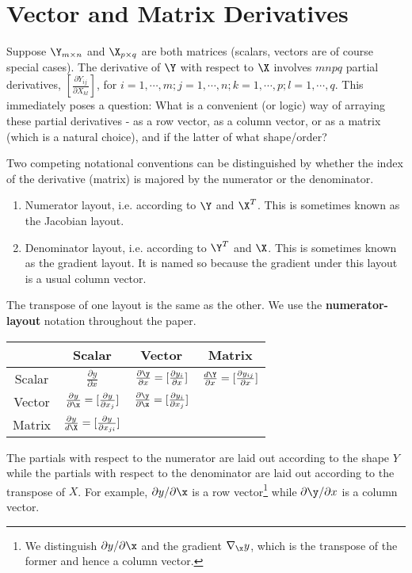 \section{Vector and Matrix Derivatives}
Suppose $\Y_{m \times n}$ and $\X_{p \times q}$ are both matrices (scalars, vectors are of course special cases). The derivative of $\Y$ with respect to $\X$ involves $mnpq$ partial derivatives, $\left[\frac{\partial Y_{ij}}{\partial X_{kl}}\right]$, for $i = 1, \cdots, m; j = 1, \cdots, n; k = 1, \cdots, p; l = 1, \cdots, q$. This immediately poses a question: What is a convenient (or logic) way of arraying these partial derivatives - as a row vector, as a column vector, or as a matrix (which is a natural choice), and if the latter of what shape/order?

Two competing notational conventions can be distinguished by whether the index of the derivative (matrix) is majored by the numerator or the denominator.
\begin{enumerate}
	\item Numerator layout, i.e. according to $\Y$ and $\X^T$. This is sometimes known as the Jacobian layout.
	\item Denominator layout, i.e. according to $\Y^T$ and $\X$. This is sometimes known as the gradient layout. It is named so because the gradient under this layout is a usual column vector.	
\end{enumerate}
The transpose of one layout is the same as the other. We use the {\bf{numerator-layout}} notation throughout the paper.

{
\renewcommand{\arraystretch}{2}
\begin{center}
    \begin{tabular}{|c|c|c|c|}
    \hline
     & Scalar & Vector & Matrix \\ \hline
    Scalar & $\frac{\partial y}{\partial x}$ & $\frac{\partial \y}{\partial x} = [\frac{\partial y_i}{\partial x}]$ & $\frac{d\Y}{\partial x} = [\frac{\partial y_{ij}}{\partial x}]$ \\ \hline
    Vector & $\frac{\partial y}{\partial \x} = [\frac{\partial y}{\partial x_j}]$ & $\frac{\partial \y}{\partial \x} = [\frac{\partial y_i}{\partial x_j}]$ &  \\ \hline
    Matrix & $\frac{\partial y}{d\X} = [\frac{\partial y}{\partial x_{ji}}]$ &  &  \\
    \hline
    \end{tabular}
\end{center}
}
The partials with respect to the numerator are laid out according to the shape $Y$ while the partials with respect to the denominator are laid out according to the transpose of $X$. For example, $\partial y/\partial \x$ is a row vector\footnote{We distinguish $\partial y/\partial \x$ and the gradient $\nabla_\x y$, which is the transpose of the former and hence a column vector.} while $\partial \y/\partial x$ is a column vector.

